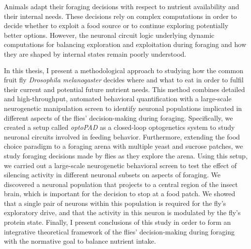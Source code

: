 
%

Animals adapt their foraging decisions with respect to nutrient availability and their internal needs. These decisions rely on complex computations in order to decide whether to exploit a food source or to continue exploring potentially better options. However, the neuronal circuit logic underlying dynamic computations for balancing exploration and exploitation during foraging and how they are shaped by internal states remain poorly understood.

\indent In this thesis, I present a methodological approach to studying how the common fruit fly \textit{Drosophila melanogaster} decides where and what to eat in order to fulfil their current and potential future nutrient needs. This method combines detailed and high-throughput, automated behavioral quantification with a large-scale neurogenetic manipulation screen to identify neuronal populations implicated in different aspects of the flies' decision-making during foraging. Specifically, we created a setup called \textit{optoPAD} as a closed-loop optogenetics system to study neuronal circuits involved in feeding behavior. Furthermore, extending the food choice paradigm to a foraging arena with multiple yeast and sucrose patches, we study foraging decisions made by flies as they explore the arena. Using this setup, we carried out a large-scale neurogenetic behavioral screen to test the effect of silencing activity in different neuronal subsets on aspects of foraging. We discovered a neuronal population that projects to a central region of the insect brain, which is important for the decision to stop at a food patch. We showed that a single pair of neurons within this population is required for the fly's exploratory drive, and that the activity in this neuron is modulated by the fly's protein state. Finally, I present conclusions of this study in order to form an integrative theoretical framework of the flies' decision-making during foraging with the normative goal to balance nutrient intake.

